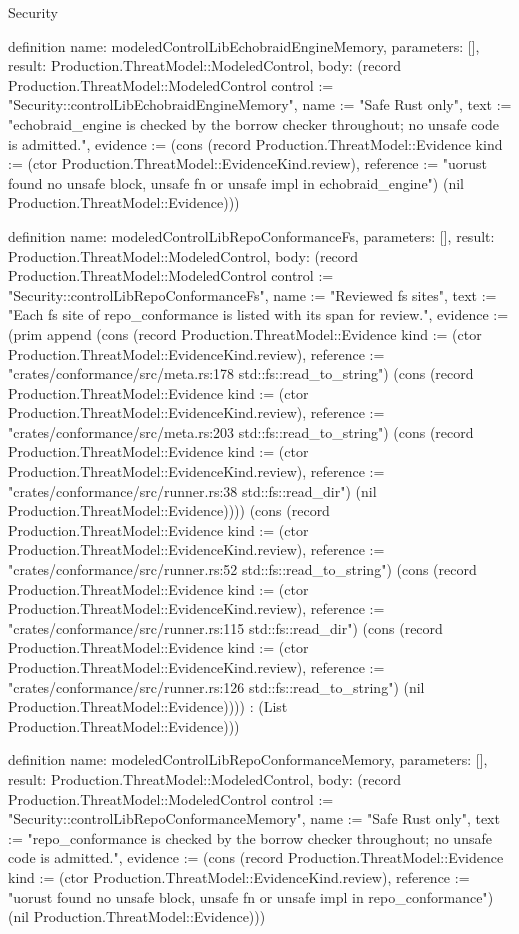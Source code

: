 \begin{lexlean}{Security}
\begin{semanticmodule}
definition{
  name: modeledControlLibEchobraidEngineMemory,
  parameters: [],
  result: Production.ThreatModel::ModeledControl,
  body: (record Production.ThreatModel::ModeledControl {control := "Security::controlLibEchobraidEngineMemory", name := "Safe Rust only", text := "echobraid_engine is checked by the borrow checker throughout; no unsafe code is admitted.", evidence := (cons (record Production.ThreatModel::Evidence {kind := (ctor Production.ThreatModel::EvidenceKind.review), reference := "uorust found no unsafe block, unsafe fn or unsafe impl in echobraid_engine"}) (nil Production.ThreatModel::Evidence))})
}

definition{
  name: modeledControlLibRepoConformanceFs,
  parameters: [],
  result: Production.ThreatModel::ModeledControl,
  body: (record Production.ThreatModel::ModeledControl {control := "Security::controlLibRepoConformanceFs", name := "Reviewed fs sites", text := "Each fs site of repo_conformance is listed with its span for review.", evidence := (prim append (cons (record Production.ThreatModel::Evidence {kind := (ctor Production.ThreatModel::EvidenceKind.review), reference := "crates/conformance/src/meta.rs:178 std::fs::read_to_string"}) (cons (record Production.ThreatModel::Evidence {kind := (ctor Production.ThreatModel::EvidenceKind.review), reference := "crates/conformance/src/meta.rs:203 std::fs::read_to_string"}) (cons (record Production.ThreatModel::Evidence {kind := (ctor Production.ThreatModel::EvidenceKind.review), reference := "crates/conformance/src/runner.rs:38 std::fs::read_dir"}) (nil Production.ThreatModel::Evidence)))) (cons (record Production.ThreatModel::Evidence {kind := (ctor Production.ThreatModel::EvidenceKind.review), reference := "crates/conformance/src/runner.rs:52 std::fs::read_to_string"}) (cons (record Production.ThreatModel::Evidence {kind := (ctor Production.ThreatModel::EvidenceKind.review), reference := "crates/conformance/src/runner.rs:115 std::fs::read_dir"}) (cons (record Production.ThreatModel::Evidence {kind := (ctor Production.ThreatModel::EvidenceKind.review), reference := "crates/conformance/src/runner.rs:126 std::fs::read_to_string"}) (nil Production.ThreatModel::Evidence)))) : (List Production.ThreatModel::Evidence))})
}

definition{
  name: modeledControlLibRepoConformanceMemory,
  parameters: [],
  result: Production.ThreatModel::ModeledControl,
  body: (record Production.ThreatModel::ModeledControl {control := "Security::controlLibRepoConformanceMemory", name := "Safe Rust only", text := "repo_conformance is checked by the borrow checker throughout; no unsafe code is admitted.", evidence := (cons (record Production.ThreatModel::Evidence {kind := (ctor Production.ThreatModel::EvidenceKind.review), reference := "uorust found no unsafe block, unsafe fn or unsafe impl in repo_conformance"}) (nil Production.ThreatModel::Evidence))})
}


\end{semanticmodule}
\end{lexlean}
